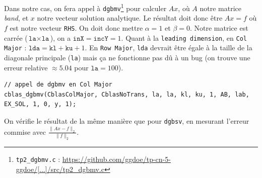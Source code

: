 \documentclass{article}
\begin{document}
Dans notre cas, on fera appel à \texttt{dgbmv}\footnote{\texttt{tp2\_dgbmv.c} : \href{https://github.com/ggdoe/tp-cn-5-ggdoe/blob/master/TP_Poisson_C_for_students/src/tp2_dgbmv.c}{https://github.com/ggdoe/tp-cn-5-ggdoe/[...]/src/tp2\_dgbmv.c}} pour calculer \(Ax\), où $A$ notre matrice \textit{band}, et $x$ notre vecteur solution analytique. Le résultat doit donc être \(Ax = f\) où $f$ est notre vecteur \texttt{RHS}. On doit donc mettre $\alpha = 1$ et $\beta = 0$. Notre matrice est carrée ($\texttt{la} \times \texttt{la}$), on a $\texttt{inX} = \texttt{incY} = 1$. Quant à la \texttt{leading dimension}, en \texttt{Col Major} : $\texttt{lda} = \texttt{kl} + \texttt{ku} + 1$. En \texttt{Row Major}, \texttt{lda} devrait être égale à la taille de la diagonale principale (\texttt{la}) mais ça ne fonctionne pas dû à un bug (on trouve une erreur relative $\approx 5.04$ pour $\texttt{la}=100$).
\begin{scriptsize}
\begin{verbatim}
// appel de dgbmv en Col Major
cblas_dgbmv(CblasColMajor, CblasNoTrans, la, la, kl, ku, 1, AB, lab, EX_SOL, 1, 0, y, 1);
\end{verbatim}
\end{scriptsize}
\noindent
On vérifie le résultat de la même manière que pour \texttt{dgbsv}, en mesurant l'erreur commise avec \(\frac{\lVert Ax - f \rVert_2}{\lVert f \rVert_2}\).
\end{document}
